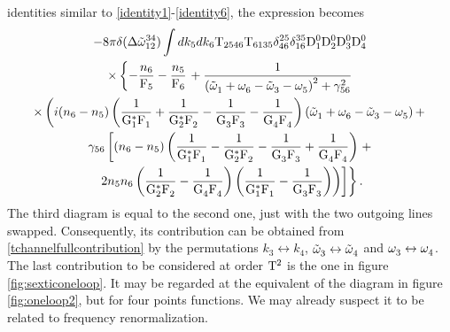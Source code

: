 identities similar to \eqref{identity1}-\eqref{identity6}, the expression becomes
\begin{multline}
    -8\pi\delta(\Delta{\tilde{\omega}}^{34}_{12})\int dk_5 dk_6\mathrm{T}_{2546}\mathrm{T}_{6135}\delta^{25}_{46}
    \delta^{35}_{16}\mathrm{D}_1^0\mathrm{D}_2^0\mathrm{D}_3^0\mathrm{D}_4^0 \\
    \times\left\{ -\frac{n_6}{\mathrm{F}_5}-\frac{n_5}{\mathrm{F}_6}\right. +
    \frac{1}{\left( \tilde{\omega}^{}_1 + \omega^{}_6 - \tilde{\omega}^{}_3 - \omega^{}_5\right)^2 + \gamma^2_{56}}\\
    \times \left(
    i(n_6-n_5)\left(\dfrac{1}{\mathrm{G}_1^*\mathrm{F}_1^{}}+\dfrac{1}{\mathrm{G}_2^*\mathrm{F}_2^{}}-\dfrac{1}{\mathrm{G}_3^{}\mathrm{F}_3^{}}
    -\dfrac{1}{\mathrm{G}_4^{}\mathrm{F}_4^{}}\right)\left(\tilde{\omega}^{}_1 + \omega^{}_6 - \tilde{\omega}^{}_3 - \omega^{}_5\right) + 
    \right.\\
    \gamma_{56}\left[(n_6-n_5 )\left(\dfrac{1}{\mathrm{G}_1^*\mathrm{F}_1^{}}-\dfrac{1}{\mathrm{G}_2^*\mathrm{F}_2^{}}-\dfrac{1}{\mathrm{G}_3^{}\mathrm{F}_3^{}}
    +\dfrac{1}{\mathrm{G}_4^{}\mathrm{F}_4^{}}\right) \right.+ \\
    \left.\left.\left.
    2n_5n_6 \left(\dfrac{1}{\mathrm{G}_2^*\mathrm{F}_2^{}}-\dfrac{1}{\mathrm{G}_4^{}\mathrm{F}_4^{}}\right)\left(\dfrac{1}{\mathrm{G}_1^*\mathrm{F}_1^{}}-\dfrac{1}{\mathrm{G}_3^{}\mathrm{F}_3^{}}
    \right)\right)
    \right]\right\}.
    \label{tchannelfullcontribution}
\end{multline}    
The third diagram is equal to the second one, just with the two outgoing lines swapped. Consequently, its contribution can be obtained from 
\eqref{tchannelfullcontribution} by the permutations $k_3 \leftrightarrow k_4$, $\tilde{\omega}^{}_3 \leftrightarrow\tilde{\omega}^{}_4$ and $\omega^{}_3 \leftrightarrow\omega^{}_4$.\\

The last contribution to be considered at order $\mathrm{T}^2$ is the one in figure \ref{fig:sexticoneloop}. It may be regarded at the equivalent of the diagram in figure 
\ref{fig:oneloop2}, but for four points functions. We may already suspect it to be related to frequency renormalization.\\

